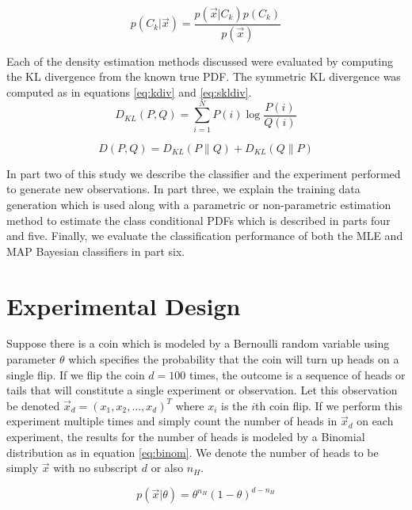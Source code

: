 \documentclass[journal]{IEEEtran}
\begin{document}
\begin{equation}
\label{eq:posterior_prob}
p(C_k\vert \vec{x}) = \frac{p(\vec{x}\vert C_k)p(C_k)}{p(\vec{x})}
\end{equation}

\par Each of the density estimation methods discussed were evaluated by computing the KL divergence from the known true PDF. The symmetric KL divergence was computed as in equations \ref{eq:kdiv} and \ref{eq:skldiv}.
\begin{equation}
\label{eq:kdiv}
D_{KL}(P,Q) = \sum_{i=1}^{N}{P(i)\log{\frac{P(i)}{Q(i)}}}
\end{equation}

\begin{equation}
\label{eq:skldiv}
D(P,Q) = D_{KL}(P\parallel Q) + D_{KL}(Q\parallel P)
\end{equation}

\par In part two of this study we describe the classifier and the experiment performed to generate new observations. In part three, we explain the training data generation which is used along with a parametric or non-parametric estimation method to estimate the class conditional PDFs which is described in parts four and five. Finally, we evaluate the classification performance of both the MLE and MAP Bayesian classifiers in part six.

\section{Experimental Design}
\par Suppose there is a coin which is modeled by a Bernoulli random variable using parameter \(\theta\) which specifies the probability that the coin will turn up heads on a single flip. If we flip the coin \(d = 100\) times, the outcome is a sequence of heads or tails that will constitute a single experiment or observation. Let this observation be denoted \(\vec{x}_d=(x_1,x_2,\ldots,x_d)^T\) where \(x_i\) is the \(i\)th coin flip. If we perform this experiment multiple times and simply count the number of heads in \(\vec{x}_d\) on each experiment, the results for the number of heads is modeled by a Binomial distribution as in equation \ref{eq:binom}. We denote the number of heads to be simply \(\vec{x}\) with no subscript \(d\) or also \(n_H\).

\begin{equation}
\label{eq:binom}
p(\vec{x} \vert \theta) = \theta^{n_H}(1-\theta)^{d-n_H}
\end{equation}
\end{document}
